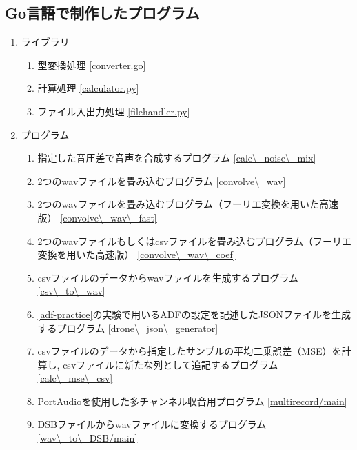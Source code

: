 \subsection{Go言語で制作したプログラム}\label{go}

\begin{enumerate}
\renewcommand{\labelenumi}{(\arabic{enumi})}
\tightlist

\item
  ライブラリ \\
  \begin{enumerate}
  \renewcommand{\labelenumi}{(\arabic{enumi})}
  \tightlist
  \item
    型変換処理 \ref{converter.go}

  \item
    計算処理  \ref{calculator.py}

  \item
    ファイル入出力処理 \ref{filehandler.py}
  \end{enumerate}

\item
  プログラム

  \begin{enumerate}
  \renewcommand{\labelenumi}{(\arabic{enumi})}

  \item
    指定した音圧差で音声を合成するプログラム \ref{calc\_noise\_mix}

  \item
    2つのwavファイルを畳み込むプログラム \ref{convolve\_wav}

  \item
    2つのwavファイルを畳み込むプログラム（フーリエ変換を用いた高速版） \ref{convolve\_wav\_fast}

  \item
    2つのwavファイルもしくはcsvファイルを畳み込むプログラム（フーリエ変換を用いた高速版） \ref{convolve\_wav\_coef}

  \item
    csvファイルのデータからwavファイルを生成するプログラム \ref{csv\_to\_wav}

  \item
    \ref{adf-practice}の実験で用いるADFの設定を記述したJSONファイルを生成するプログラム \ref{drone\_json\_generator}

  \item
    csvファイルのデータから指定したサンプルの平均二乗誤差（MSE）を計算し, csvファイルに新たな列として追記するプログラム \ref{calc\_mse\_csv}

  \item
    PortAudioを使用した多チャンネル収音用プログラム \ref{multirecord/main}

  \item
    DSBファイルからwavファイルに変換するプログラム \ref{wav\_to\_DSB/main}
  \end{enumerate}
\end{enumerate}

